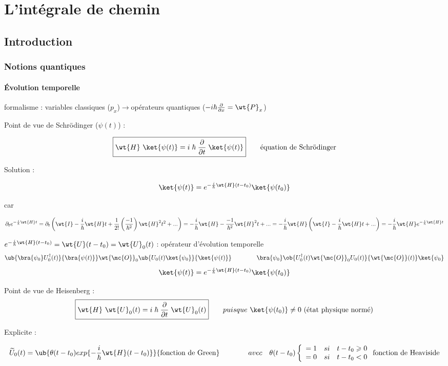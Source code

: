 \chapter{L'intégrale de chemin}
\section{Introduction} %
\subsection{Notions quantiques} %
\subsubsection{Évolution temporelle} %
formalisme : variables classiques ($p_x$)\quad$\to$\quad opérateurs quantiques
($-i\hbar \frac{\partial}{\partial x}=\wt{P}_x$)

Point de vue de Schrödinger ($\psi(t)$) : 

\[
\boxed{\wt{H}\ \ket{\psi(t)}={i}\;{\hbar}\;\frac{\partial}{\partial t}\;\ket{\psi(t)}
} \qquad \text{équation de Schrödinger}
\]

Solution :

\[
\ket{\psi(t)}=e^{-\frac{i}{\hbar}\wt{H}(t-t_0)}\ket{\psi(t_0)}
\]

car 

\[
\partial_te^{-\frac{i}{\hbar}\wt{H}t} = \partial_t\left(\wt{I}-\frac{i}{\hbar}\wt{H}t + 
\frac{1}{2!}\left(\frac{-1}{\hbar^2}\right)\wt{H}^2t^2+...\right)=
-\frac{i}{\hbar}\wt{H}-\frac{-1}{\hbar^2}\wt{H}^2t+...=
-\frac{i}{\hbar}\wt{H}\left(\wt{I}-\frac{i}{\hbar}\wt{H}t+...\right)=
-\frac{i}{\hbar}\wt{H}e^{-\frac{i}{\hbar}\wt{H}t}
\]

$e^{-\frac{i}{\hbar}\wt{H}(t-t_0)} = \wt{U}(t-t_0) = \wt{U}_0(t)$ : opérateur d'évolution temporelle
\[
\ub{\bra{\psi_0}U_0^\dagger(t)}{\bra{\psi(t)}} \wt{\mc{O}}_0
\ub{U_0(t)\ket{\psi_0}}{\ket{\psi(t)}} \qquad\qquad\bra{\psi_0}
\ob{U_0^\dagger(t)\wt{\mc{O}}_0U_0(t)}{\wt{\mc{O}}(t)}\ket{\psi_0}
\]
\[
\ket{\psi(t)}=e^{-\frac{i}{\hbar}\wt{H}(t-t_0)}\ket{\psi(t_0)}
\]

Point de vue de Heisenberg :
\[
\boxed{\wt{H}\ \wt{U}_0(t)=i\;\hbar\;\frac{\partial}{\partial t}\;\wt{U}_0(t)}
\qquad puisque\ \ket{\psi(t_0)}\neq 0 \text{ (état physique normé)}
\]

Explicite : 

\[
\widetilde{U}_0(t) = \ub{\theta(t-t_0)exp\{-\frac{i}{\hbar}\wt{H}(t-t_0)\}}
{\text{fonction de Green}}\qquad\qquad avec\quad 
\theta(t-t_0) \left \{
   \begin{array}{r c l}
      =1 & si & t-t_0\geqslant0 \\
      =0 & si  & t-t_0<0 
   \end{array}
\right . \text{fonction de Heaviside}
\]

